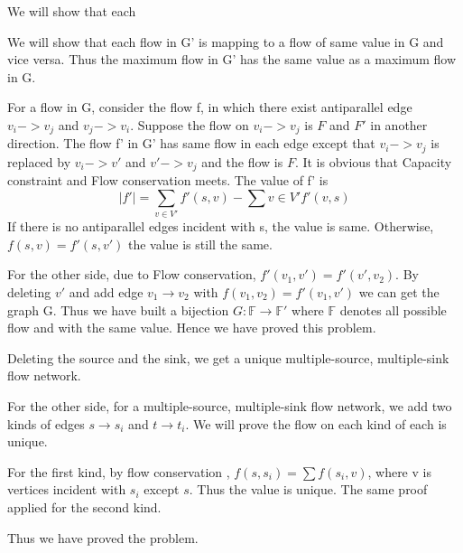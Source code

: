 \maketitle
{}
\begin{nproblem}[26.1.1]
    We will show that each
\end{nproblem}
\begin{csolution}
    We will show that each flow in G' is mapping to a flow of same value in G and vice versa. Thus the maximum flow in G' has the same value as a maximum flow in G.

    For a flow in G, consider the flow f, in which there exist antiparallel edge $v_i->v_j$ and $v_j->v_i$. Suppose the flow on $v_i->v_j$ is $F$ and $F'$ in another direction. The flow f' in G' has same flow in each edge except that $v_i->v_j$ is replaced by $v_i->v'$ and $v'->v_j$ and the flow is $F$. It is obvious that Capacity constraint and Flow conservation meets. The value of f' is 
        $$|f'|=\sum_{v\in V'}f'(s,v)-\sum{v\in V'}f'(v,s)$$ 
    If there is no antiparallel edges incident with s, the value is same. Otherwise, $f(s,v)=f'(s,v')$ the value is still the same.

    For the other side, due to Flow conservation, $f'(v_1,v')=f'(v',v_2)$. By deleting $v'$ and add edge $v_1\rightarrow v_2$ with $f(v_1,v_2)=f'(v_1,v')$ we can get the graph G. Thus we have built a bijection $G:\mathbb{F}\rightarrow\mathbb{F'}$ where $\mathbb{F}$ denotes all possible flow and with the same value. Hence we have proved this problem.
\end{csolution}

\begin{cproblem}[26.1.2]
\end{cproblem}
\begin{csolution}
    Deleting the source and the sink, we get a unique multiple-source, multiple-sink flow network.

    For the other side, for a multiple-source, multiple-sink flow network, we add two kinds of edges $s\rightarrow s_i$ and $t\rightarrow t_i$. We will prove the flow on each kind of each is unique.
    
    For the first kind, by flow conservation , $f(s, s_i)=\sum f(s_i, v)$, where v is vertices incident with $s_i$ except $s$. Thus the value is unique. The same proof applied for the second kind.

    Thus we have proved the problem.
\end{csolution}


